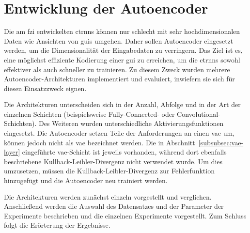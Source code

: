 \chapter{Entwicklung der Autoencoder}
\label{cha:autoencoder}
Die am \gls{fzi} entwickelten \glspl{ctrnn} können nur schlecht mit sehr hochdimensionalen Daten wie Ansichten von \glspl{gui} umgehen.  Daher sollen Autoencoder eingesetzt werden, um die Dimensionalität der Eingabedaten zu verringern. Das Ziel ist es, eine möglichst effiziente Kodierung einer \gls{gui} zu erreichen, um die \glspl{ctrnn} sowohl effektiver als auch schneller zu trainieren.
Zu diesem Zweck wurden mehrere Autoencoder-Architekturen implementiert und evaluiert, inwiefern sie sich für diesen Einsatzzweck eignen.

Die Architekturen unterscheiden sich in der Anzahl, Abfolge und in der Art der einzelnen Schichten (beispielsweise Fully-Connected- oder Convolutional-Schichten). Des Weiteren wurden unterschiedliche Aktivierungsfunktionen eingesetzt. Die Autoencoder setzen Teile der Anforderungen an einen \gls{vae} um, können jedoch nicht als \gls{vae} bezeichnet werden. Die in Abschnitt~\ref{subsubsec:vae-layer} eingeführte \gls{vae}-Schicht ist jeweils vorhanden, während dort ebenfalls beschriebene Kullback-Leibler-Divergenz nicht verwendet wurde. Um dies umzusetzen, müssen die Kullback-Leibler-Divergenz zur Fehlerfunktion hinzugefügt und die Autoencoder neu trainiert werden.

Die Architekturen werden zunächst einzeln vorgestellt und verglichen. Anschließend werden die Auswahl des Datensatzes und der Parameter der Experimente beschrieben und die einzelnen Experimente vorgestellt. Zum Schluss folgt die Erörterung der Ergebnisse.




